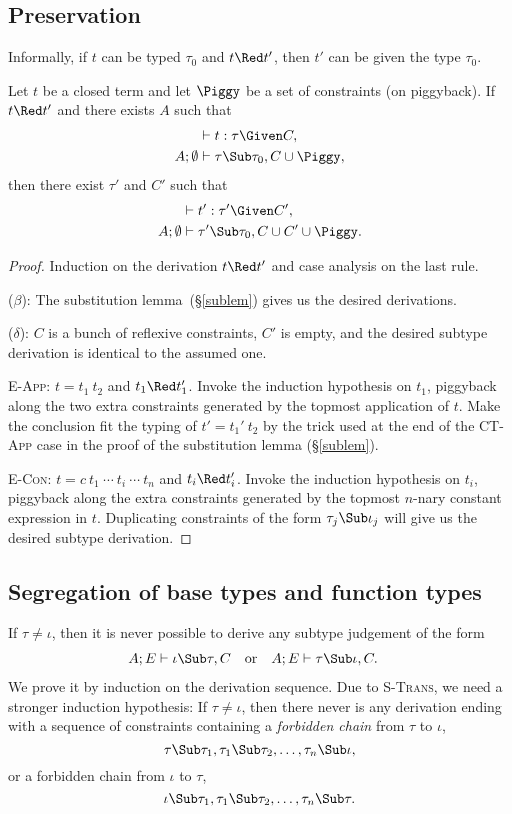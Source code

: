 \documentclass{amsart}
\theoremstyle{definition}
\begin{document}
\subsection{Preservation}

Informally, if $t$ can be typed $\tau_0$ and $t\Red t'$,
then $t'$ can be given the type $\tau_0$.

Let $t$ be a closed term and let $\Piggy$ be a set of constraints
(on piggyback). If $t\Red t'$ and there exists $A$ such that
\begin{align*}
&\vdash t:\tau \Given C,\\
A;\emptyset&\vdash \tau\Sub\tau_0,C\cup\Piggy,
\end{align*}
then there exist $\tau'$ and $C'$ such that
\begin{align*}
&\vdash t':\tau'\Given C',\\
A;\emptyset&\vdash \tau'\Sub\tau_0,C\cup C'\cup\Piggy.
\end{align*}

\begin{proof}
Induction on the derivation $t\Red t'$ and case analysis on the
last rule.

\Case($\beta$): The substitution lemma~(\S\ref{sublem}) gives us
the desired derivations.

\Case($\delta$): $C$ is a bunch of reflexive constraints, $C'$ is
empty, and the desired subtype derivation is identical to the
assumed one.

\Case\textsc{E-App}: $t=t_1~t_2$ and $t_1\Red t_1'$. Invoke the
induction hypothesis on $t_1$, piggyback along the two extra
constraints generated by the topmost application of $t$. Make
the conclusion fit the typing of $t'=t_1'~t_2$ by the trick used
at the end of the \textsc{CT-App} case in the proof of the
substitution lemma (\S\ref{sublem}).

\Case\textsc{E-Con}: $t=c~t_1~\cdots~t_i~\cdots~t_n$ and $t_i\Red
t_i'$. Invoke the induction hypothesis on $t_i$, piggyback along
the extra constraints generated by the topmost $n$-nary constant
expression in $t$. Duplicating constraints of the form
$\tau_j\Sub\iota_j$ will give us the desired subtype derivation.
\end{proof}

\subsection{Segregation of base types and function types}
\label{segre}
If $\tau\neq\iota$, then it is never possible to derive any
subtype judgement of the form
\begin{align*}
A;E&\vdash \iota\Sub\tau,C&
&\mbox{or}&
A;E&\vdash\tau\Sub\iota,C.
\end{align*}
We prove it by induction on the derivation sequence. Due to
\textsc{S-Trans}, we need a stronger induction hypothesis: If
$\tau\neq\iota$, then there never is any derivation ending with a
sequence of constraints containing a \emph{forbidden chain} from
$\tau$ to $\iota$,
\[
\tau\Sub\tau_1,\tau_1\Sub\tau_2,\ldots,\tau_n\Sub\iota,
\]
or a forbidden chain from $\iota$ to $\tau$,
\[
\iota\Sub\tau_1,\tau_1\Sub\tau_2,\ldots,\tau_n\Sub\tau.
\]
\end{document}
